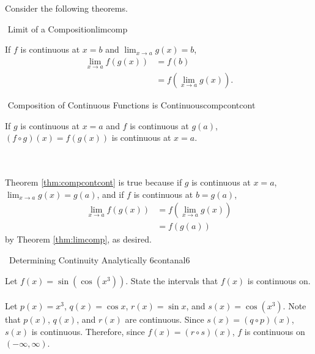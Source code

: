         \vphantom
        \\
        \\
        Consider the following theorems.
        \begin{theorem}{\Stop\,\,Limit of a Composition}{limcomp}

            If \(f\) is continuous at \(x=b\) and \(\lim_{x\to a}g(x)=b\),
            \begin{align*}
                \lim_{x\to a}f(g(x))&=f(b) \\
                &=f\left(\lim_{x\to a}g(x)\right).
            \end{align*}
            
        \end{theorem}
        \begin{theorem}{\Stop\,\,Composition of Continuous Functions is Continuous}{compcontcont}

           If \(g\) is continuous at \(x=a\) and \(f\) is continuous at \(g(a)\), \((f\circ g)(x)=f(g(x))\) is continuous at \(x=a\).
            
        \end{theorem}
        \vphantom
        \\
        \\
        Theorem \ref{thm:compcontcont} is true because if \(g\) is continuous at \(x=a\), \(\lim_{x\to a}g(x)=g(a)\), and if \(f\) is continuous at \(b=g(a)\),
        \begin{align*}
            \lim_{x\to a}f(g(x))&=f\left(\lim_{x\to a}g(x)\right) \\
            &=f(g(a))
        \end{align*}
        by Theorem \ref{thm:limcomp}, as desired.
        \begin{example}{\Difficulty\,\Difficulty\,\,Determining Continuity Analytically 6}{contanal6}

            Let \(f(x)=\sin(\cos(x^3))\).
            State the intervals that \(f(x)\) is continuous on.
            \\
            \\
            Let \(p(x)=x^3\), \(q(x)=\cos x\), \(r(x)=\sin x\), and \(s(x)=\cos(x^3)\). Note that \(p(x)\), \(q(x)\), and \(r(x)\) are continuous. Since \(s(x)=(q\circ p)(x)\), \(s(x)\) is continuous. Therefore, since \(f(x)=(r\circ s)(x)\), \(f\) is continuous on \((-\infty,\infty)\).

        \end{example}
        \vphantom
        \\
